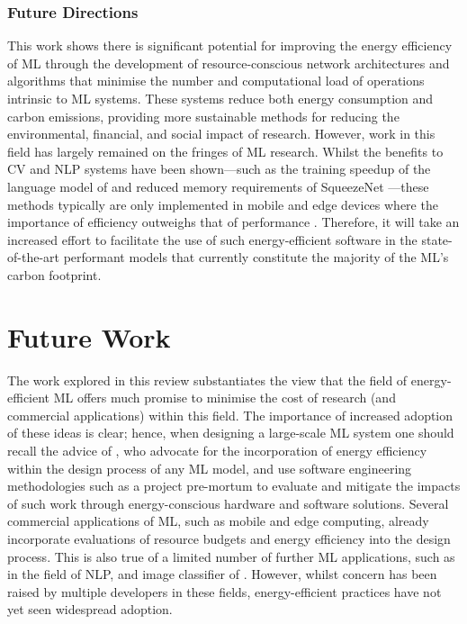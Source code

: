\documentclass[a4paper, 12pt]{article}
\begin{document}
    \subsubsection{Future Directions}

    This work shows there is significant potential for improving the energy efficiency of ML through the development of resource-conscious network architectures and algorithms that minimise the number and computational load of operations intrinsic to ML systems. These systems reduce both energy consumption and carbon emissions, providing more sustainable methods for reducing the environmental, financial, and social impact of research. However, work in this field has largely remained on the fringes of ML research. Whilst the benefits to CV and NLP systems have been shown---such as the training speedup of the language model of \citet{yang-2020} and reduced memory requirements of SqueezeNet \citep{iandola-2016}---these methods typically are only implemented in mobile and edge devices where the importance of efficiency outweighs that of performance \citep{kumar-2020}. Therefore, it will take an increased effort to facilitate the use of such energy-efficient software in the state-of-the-art performant models that currently constitute the majority of the ML's carbon footprint.


    \section{Future Work}

    The work explored in this review substantiates the view that the field of energy-efficient ML offers much promise to minimise the cost of research (and commercial applications) within this field. The importance of increased adoption of these ideas is clear; hence, when designing a large-scale ML system one should recall the advice of \citet{sharma-kaulgud-2021}, who advocate for the incorporation of energy efficiency within the design process of any ML model, and use software engineering methodologies such as a project pre-mortum \citep{klein-2008} to evaluate and mitigate the impacts of such work through energy-conscious hardware and software solutions. Several commercial applications of ML, such as mobile and edge computing, already incorporate evaluations of resource budgets and energy efficiency into the design process. This is also true of a limited number of further ML applications, such as \citet{so-2019} in the field of NLP, and image classifier of \citet{iandola-2016}. However, whilst concern has been raised by multiple developers in these fields, energy-efficient practices have not yet seen widespread adoption.
\end{document}

